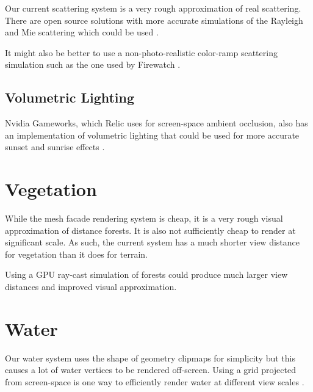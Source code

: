 Our current scattering system is a very rough approximation of real scattering.
There are open source solutions with more accurate simulations of the Rayleigh and Mie scattering which could be used \cite{atmosphere}.

It might also be better to use a non-photo-realistic color-ramp scattering simulation such as the one used by Firewatch \cite{firewatch_fog}.


\subsection{Volumetric Lighting}

Nvidia Gameworks, which Relic uses for screen-space ambient occlusion, also has an implementation of volumetric lighting that could be used for more accurate sunset and sunrise effects \cite{nvidia_volumetric}.


\section{Vegetation}

While the mesh facade rendering system is cheap, it is a very rough visual approximation of distance forests.
It is also not sufficiently cheap to render at significant scale.
As such, the current system has a much shorter view distance for vegetation than it does for terrain.

Using a GPU ray-cast simulation of forests could produce much larger view distances and improved visual approximation. \cite{terraintreecast}


\section{Water}

Our water system uses the shape of geometry clipmaps for simplicity but this causes a lot of water vertices to be rendered off-screen.
Using a grid projected from screen-space is one way to efficiently render water at different view scales \cite{bruneton_water}.
